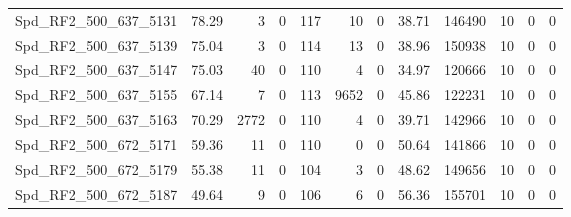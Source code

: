 \begin{longtable}[c]{@{}lrrrrrrrrrrr@{}}
Spd\_RF2\_500\_637\_5131      & 78.29                  & 3                       & 0                       & 117                    & 10                      & 0                       & 38.71                   & 146490                   & 10                       & 0                        & 0                        \\
Spd\_RF2\_500\_637\_5139      & 75.04                  & 3                       & 0                       & 114                    & 13                      & 0                       & 38.96                   & 150938                   & 10                       & 0                        & 0                        \\
Spd\_RF2\_500\_637\_5147      & 75.03                  & 40                      & 0                       & 110                    & 4                       & 0                       & 34.97                   & 120666                   & 10                       & 0                        & 0                        \\
Spd\_RF2\_500\_637\_5155      & 67.14                  & 7                       & 0                       & 113                    & 9652                    & 0                       & 45.86                   & 122231                   & 10                       & 0                        & 0                        \\
Spd\_RF2\_500\_637\_5163      & 70.29                  & 2772                    & 0                       & 110                    & 4                       & 0                       & 39.71                   & 142966                   & 10                       & 0                        & 0                        \\
Spd\_RF2\_500\_672\_5171      & 59.36                  & 11                      & 0                       & 110                    & 0                       & 0                       & 50.64                   & 141866                   & 10                       & 0                        & 0                        \\
Spd\_RF2\_500\_672\_5179      & 55.38                  & 11                      & 0                       & 104                    & 3                       & 0                       & 48.62                   & 149656                   & 10                       & 0                        & 0                        \\
Spd\_RF2\_500\_672\_5187      & 49.64                  & 9                       & 0                       & 106                    & 6                       & 0                       & 56.36                   & 155701                   & 10                       & 0                        & 0                        \\

\end{longtable}

